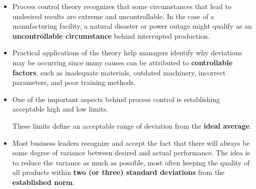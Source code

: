 \documentclass[12pt]{article}
\begin{document}
\begin{itemize}
\item Process control theory recognizes that some circumstances that lead to undesired results are extreme and uncontrollable. In the case of a manufacturing facility, a natural disaster or power outage might qualify as an \textbf{uncontrollable circumstance} behind interrupted production. 
\item Practical applications of the theory help managers identify why deviations may be occurring since many causes can be attributed to \textbf{controllable factors}, such as inadequate materials, outdated machinery, incorrect parameters, and poor training methods. 
\item  One of the important aspects behind process control is establishing acceptable high and low limits.

These limits define an acceptable range of deviation from the \textbf{ideal average}. 
\item Most business leaders recognize and accept the fact that there will always be some degree of variance between desired and actual performance. The idea is to reduce the variance as much as possible, most often keeping the quality of all products within \textbf{two (or three) standard deviations} from the \textbf{established norm}.
\end{itemize}
\end{document}
